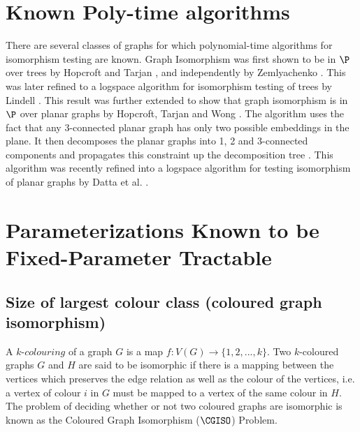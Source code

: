 \documentclass[11pt]{report}
\begin{document}
\section{Known Poly-time algorithms}


There are several classes of graphs for which polynomial-time algorithms for isomorphism testing are known. Graph Isomorphism was first shown to be in $\P$ over trees by Hopcroft and Tarjan \cite{HopcroftTarjan74}, and independently by Zemlyachenko \cite{Zemlyachenko70} \cite{Kobler2006}. This was later refined to a logspace algorithm for isomorphism testing of trees by Lindell \cite{Lindell92}. This result was further extended to show that graph isomorphism is in $\P$ over planar graphs by Hopcroft, Tarjan and Wong \cite{HopcroftTarjan72} \cite{HopcroftWong74}. The algorithm uses the fact that any 3-connected planar graph has only two possible embeddings in the plane. It then decomposes the planar graphs into 1, 2 and 3-connected components and propagates this constraint up the decomposition tree \cite{HopcroftWong74}. This algorithm was recently refined into a logspace algorithm for testing isomorphism of planar graphs by Datta et al. \cite{Datta09}.



\section{Parameterizations Known to be Fixed-Parameter Tractable}




\subsection{Size of largest colour class (coloured graph isomorphism)}

A $k$-$colouring$ of a graph $G$ is a map $f:V(G) \rightarrow \{1,2,...,k\}$. Two $k$-coloured graphs $G$ and $H$ are said to be isomorphic if there is a mapping between the vertices which preserves the edge relation as well as the colour of the vertices, i.e. a vertex of colour $i$  in $G$ must be mapped to a vertex of the same colour in $H$. The problem of deciding whether or not two coloured graphs are isomorphic is known as the Coloured Graph Isomorphism ($\CGISO$) Problem. 
\end{document}
